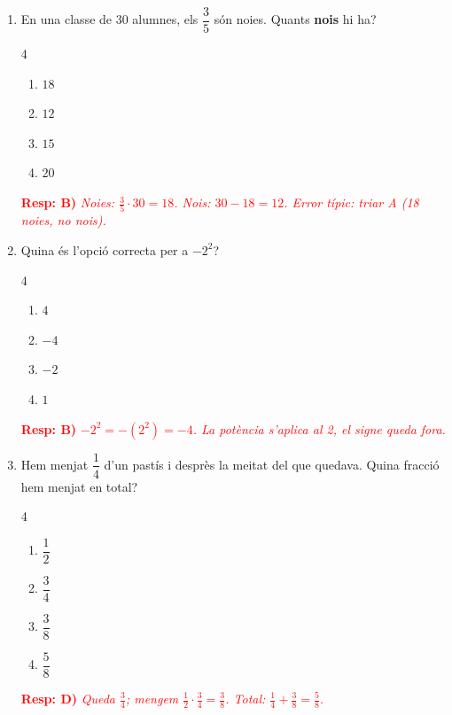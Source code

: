 \documentclass[a4paper, 11pt]{article}
\begin{document}
\begin{enumerate}[label=\textbf{\arabic*.}, itemsep=0.8em]
    \item En una classe de 30 alumnes, els $\dfrac{3}{5}$ són noies. Quants \textbf{nois} hi ha?
    \begin{multicols}{4}
    \begin{enumerate}[label=\textbf{\Alph*)}, itemsep=0.3em]
        \item $18$ \item $12$ \item $15$ \item $20$
    \end{enumerate}
    \end{multicols}
    \textcolor{red}{\textbf{Resp: B)} \textit{Noies: $\frac{3}{5}\cdot30=18$. Nois: $30-18=12$. Error típic: triar A (18 noies, no nois).}}

    \item Quina és l'opció correcta per a $-2^2$?
    \begin{multicols}{4}
    \begin{enumerate}[label=\textbf{\Alph*)}, itemsep=0.3em]
        \item $4$ \item $-4$ \item $-2$ \item $1$
    \end{enumerate}
    \end{multicols}
    \textcolor{red}{\textbf{Resp: B)} \textit{$-2^2=-(2^2)=-4$. La potència s'aplica al 2, el signe queda fora.}}

    \item Hem menjat $\dfrac{1}{4}$ d'un pastís i desprès la meitat del que quedava. Quina fracció hem menjat en total?
    \begin{multicols}{4}
    \begin{enumerate}[label=\textbf{\Alph*)}, itemsep=0.3em]
        \item $\dfrac{1}{2}$ \item $\dfrac{3}{4}$ \item $\dfrac{3}{8}$ \item $\dfrac{5}{8}$
    \end{enumerate}
    \end{multicols}
    \textcolor{red}{\textbf{Resp: D)} \textit{Queda $\frac{3}{4}$; mengem $\frac{1}{2}\cdot\frac{3}{4}=\frac{3}{8}$. Total: $\frac{1}{4}+\frac{3}{8}=\frac{5}{8}$.}}

\end{enumerate}

\newpage
\end{document}
